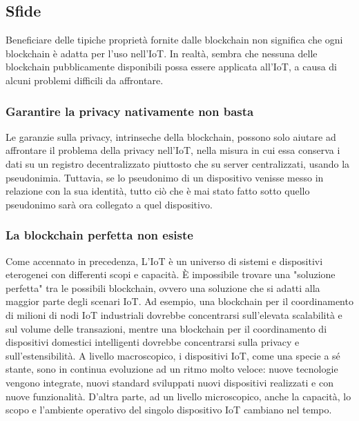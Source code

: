 \subsection{Sfide}
Beneficiare delle tipiche proprietà fornite dalle blockchain non significa che ogni blockchain è adatta per l'uso nell'IoT. In realtà, sembra che nessuna delle blockchain pubblicamente disponibili possa essere applicata all'IoT, a causa di alcuni problemi difficili da affrontare.

\subsubsection{Garantire la privacy nativamente non basta}
Le garanzie sulla privacy, intrinseche della blockchain, possono solo aiutare ad affrontare il problema della privacy
nell'IoT, nella misura in cui essa conserva i dati su un registro decentralizzato piuttosto che su server centralizzati, usando la pseudonimia. Tuttavia, se lo pseudonimo di un dispositivo venisse messo in relazione con la sua identità, tutto ciò che è mai stato fatto sotto quello pseudonimo sarà ora collegato a quel dispositivo.

\subsubsection{La blockchain perfetta non esiste}
Come accennato in precedenza, L'IoT è un universo di sistemi e dispositivi eterogenei con differenti scopi e capacità. È impossibile trovare una "soluzione perfetta" tra le possibili blockchain, ovvero una soluzione che si adatti alla maggior parte degli scenari IoT. Ad esempio, una blockchain per il coordinamento di milioni di nodi IoT industriali dovrebbe concentrarsi sull'elevata scalabilità e sul volume delle transazioni, mentre una blockchain per il coordinamento di dispositivi domestici intelligenti dovrebbe concentrarsi sulla privacy e sull'estensibilità. A livello macroscopico, i dispositivi IoT, come una specie a sé stante, sono in continua evoluzione ad un ritmo molto veloce: nuove tecnologie vengono integrate, nuovi standard sviluppati nuovi dispositivi realizzati e con nuove funzionalità. D'altra parte, ad un livello microscopico, anche la capacità, lo scopo e l'ambiente operativo del singolo dispositivo IoT cambiano nel tempo.

